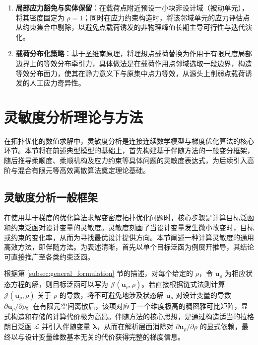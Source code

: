 \begin{enumerate}[{（}1{）}]
	\item \textbf{局部应力豁免与实体保留}：在载荷点附近预设一小块非设计域（被动单元），将其密度固定为 $\rho=1$；同时在应力约束构造时，将该邻域单元的应力评估点从约束集合中剔除，以避免点载荷诱发的非物理峰值长期主导可行性与迭代演化。
	
	\item \textbf{载荷分布化策略}：基于圣维南原理，将理想点载荷替换为作用于有限尺度局部边界上的等效分布牵引力，具体做法是在载荷作用点邻域选取一段边界，构造等效分布面力，使其在静力意义下与原集中点力等效，从源头上削弱点载荷诱发的人工应力奇异性。
\end{enumerate}


\section{灵敏度分析理论与方法}
\label{sec:sensitivity_analysis}

在拓扑优化的数值求解中，灵敏度分析是连接连续数学模型与梯度优化算法的核心环节。本节将在前述典型模型的基础上，首先构建基于伴随方法的一般变分框架，随后推导柔顺度、柔顺机构及应力约束等具体问题的灵敏度表达式，为后续引入高阶与混合有限元等高效离散算法奠定理论基础。


\subsection{灵敏度分析一般框架}
\label{subsec:sensitivity_framework}

在使用基于梯度的优化算法求解变密度拓扑优化问题时，核心步骤是计算目标泛函和约束泛函对设计变量的灵敏度。灵敏度刻画了当设计变量发生微小改变时，目标或约束的变化率，从而为寻找最优设计提供方向。本节阐述一种计算灵敏度的通用高效方法，即伴随方法。为表述清晰，首先以单个目标泛函为例展开推导，其结论可直接推广至各类约束泛函。

根据第 \ref{subsec:general_formulation} 节的描述，对每个给定的 $\rho$，令 $\boldsymbol{u}_\rho$ 为相应状态方程的解，则目标泛函可以写为 $\mathcal{J}(\boldsymbol{u}_\rho, \rho)$。若直接根据链式法则计算 $\mathcal{J}(\boldsymbol{u}_\rho, \rho)$ 关于 $\rho$ 的导数，将不可避免地涉及状态解 $\boldsymbol{u}_\rho$ 对设计变量的导数 $\partial\boldsymbol{u}_\rho/\partial\rho$。在有限元空间离散后，该项对应于一个维度极高的稠密雅可比矩阵，显式构造和存储的计算代价极为高昂。伴随方法的核心思想，是通过构造适当的拉格朗日泛函 $\mathcal{L}$ 并引入伴随变量 $\boldsymbol{\lambda}$，从而在解析层面消除对 $\partial\boldsymbol{u}_\rho/\partial\rho$ 的显式依赖，最终以与设计变量维数基本无关的代价获得完整的梯度信息。

